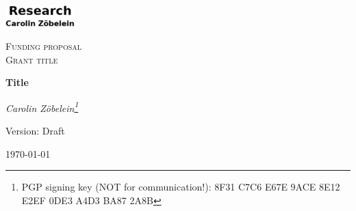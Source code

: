 

\begin{titlepage}
	\begin{center}
    \begin{center}
            \includegraphics[width=0.2\textwidth]{images/logo_web.png}
    \end{center}
    \vspace{1cm}
	{\scshape\Large Funding proposal\\ Grant title\par}	%
	\vspace{1.5cm}
	{\huge\bfseries Title\par}	%
	\vspace{2cm}
	{\Large\itshape Carolin Z\"obelein\footnote{PGP signing key (NOT for communication!): 8F31 C7C6 E67E 9ACE 8E12 E2EF 0DE3 A4D3 BA87 2A8B}\par}
	\vfill

	\vfill

	{\large Version: Draft\par}	%
	{\large \today\par}
	\end{center}
\end{titlepage}
\newpage
